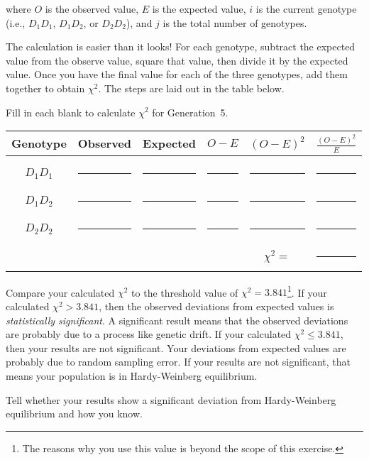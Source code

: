 \documentclass[12pt][hidelinks]{exam}
\begin{document}
\begin{questions}
where $O$ is the observed value, $E$ is the expected value, $i$ is the current 
genotype (i.e., $D_1D_1$, $ D_1D_2$, or $D_2D_2$), and $j$ is the total number 
of genotypes. 

The calculation is easier than it looks! For each genotype, subtract the 
expected value from the observe value, square that value, then divide it 
by the expected value. Once you have the final value for each of the three 
genotypes, add them together to obtain $\chi^2$. The steps are laid out 
in the table below. 

\question[Checkout]
Fill in each blank to calculate $\chi^2$ for Generation~5.

\begin{longtable}{cccccc}
	\toprule
	Genotype & Observed & Expected & $O-E$ & $(O-E)^2$ & $\frac{(O-E)^2}{E}$ \tabularnewline
	\midrule
	&&&&&\tabularnewline
	$D_1D_1$ & \rule{0.5in}{0.4pt} & \rule{0.5in}{0.4pt} & \rule{0.5in}{0.4pt} & \rule{0.5in}{0.4pt} & \rule{0.5in}{0.4pt}\tabularnewline[2em]
	$D_1D_2$ & \rule{0.5in}{0.4pt} & \rule{0.5in}{0.4pt} & \rule{0.5in}{0.4pt} & \rule{0.5in}{0.4pt} & \rule{0.5in}{0.4pt}\tabularnewline[2em]
	$D_2D_2$ & \rule{0.5in}{0.4pt} & \rule{0.5in}{0.4pt} & \rule{0.5in}{0.4pt} & \rule{0.5in}{0.4pt} & \rule{0.5in}{0.4pt}\tabularnewline[2em]
	&&&& $\chi^2 = $& \rule{0.5in}{0.4pt}\tabularnewline
	\bottomrule
\end{longtable}

Compare your calculated $\chi^2$ to the threshold value of $\chi^2 = 3.841$\footnote{The reasons why you use this value is beyond the scope of this exercise.}. If your calculated $\chi^2 > 3.841$, then the observed deviations from expected values is \emph{statistically significant}. A significant result means that the observed deviations are probably due to a process like genetic drift. If your calculated $\chi^2 \le 3.841$, then your results are not significant. Your deviations from expected values are probably due to random sampling error. If your results are not significant, that means your population is in Hardy-Weinberg equilibrium.

\question[Checkout]
Tell whether your results show a significant deviation from Hardy-Weinberg equilibrium and how you know. 


\end{questions}


\newpage
\end{document}

